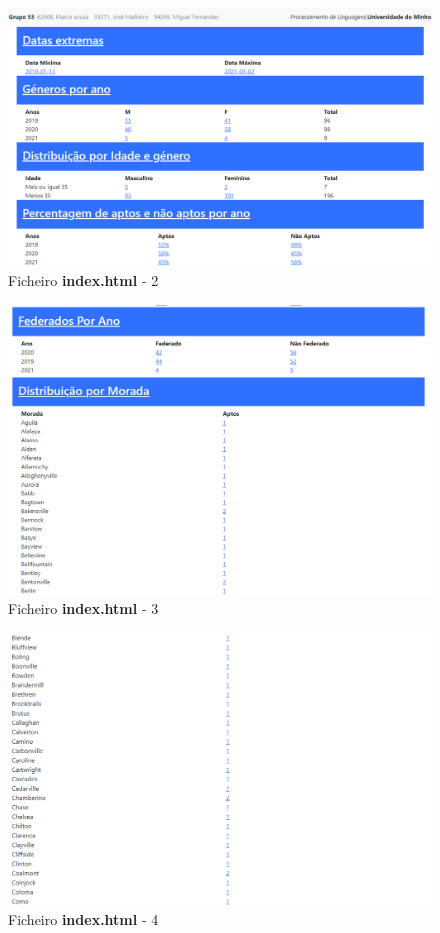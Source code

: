 \documentclass[runningheads]{llncs}
\begin{document}
\begin{figure}
    \centering
    \includegraphics[width=\linewidth]{assets/index2.png}
    \caption{Ficheiro \textbf{index.html} - 2}
    \label{fig:index.html2}
\end{figure}

\begin{figure}
    \centering
    \includegraphics[width=\linewidth]{assets/index3.png}
    \caption{Ficheiro \textbf{index.html} - 3}
    \label{fig:index.html3}
\end{figure}

\begin{figure}
    \centering
    \includegraphics[width=\linewidth]{assets/index4.png}
    \caption{Ficheiro \textbf{index.html} - 4}
    \label{fig:index.html4}
\end{figure}
\end{document}
